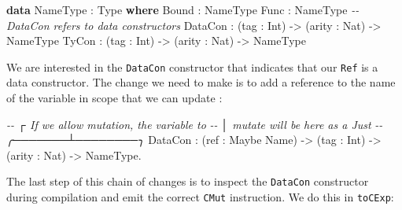 \documentclass[
]{article}
\newenvironment{Shaded}{}{}
\newcommand{\CommentTok}[1]{\textcolor[rgb]{0.38,0.63,0.69}{\textit{#1}}}
\newcommand{\DataTypeTok}[1]{\textcolor[rgb]{0.56,0.13,0.00}{#1}}
\newcommand{\FunctionTok}[1]{\textcolor[rgb]{0.02,0.16,0.49}{#1}}
\newcommand{\KeywordTok}[1]{\textcolor[rgb]{0.00,0.44,0.13}{\textbf{#1}}}
\newcommand{\NormalTok}[1]{#1}
\newcommand{\OperatorTok}[1]{\textcolor[rgb]{0.40,0.40,0.40}{#1}}
\newcommand{\OtherTok}[1]{\textcolor[rgb]{0.00,0.44,0.13}{#1}}
\begin{document}
\begin{Shaded}
\begin{Highlighting}[]
\KeywordTok{data} \DataTypeTok{NameType} \OperatorTok{:} \DataTypeTok{Type} \KeywordTok{where}
     \DataTypeTok{Bound}   \OperatorTok{:} \DataTypeTok{NameType}
     \DataTypeTok{Func}    \OperatorTok{:} \DataTypeTok{NameType}
     \CommentTok{{-}{-} DataCon refers to data constructors}
     \DataTypeTok{DataCon} \OperatorTok{:}\NormalTok{ (tag }\OperatorTok{:} \DataTypeTok{Int}\NormalTok{) }\OtherTok{{-}\textgreater{}}\NormalTok{ (arity }\OperatorTok{:} \DataTypeTok{Nat}\NormalTok{) }\OtherTok{{-}\textgreater{}} \DataTypeTok{NameType}
     \DataTypeTok{TyCon}   \OperatorTok{:}\NormalTok{ (tag }\OperatorTok{:} \DataTypeTok{Int}\NormalTok{) }\OtherTok{{-}\textgreater{}}\NormalTok{ (arity }\OperatorTok{:} \DataTypeTok{Nat}\NormalTok{) }\OtherTok{{-}\textgreater{}} \DataTypeTok{NameType}
\end{Highlighting}
\end{Shaded}

We are interested in the \texttt{DataCon} constructor that indicates
that our \texttt{Ref} is a data constructor. The change we need to make
is to add a reference to the name of the variable in scope that we can
update :

\begin{Shaded}
\begin{Highlighting}[]
\CommentTok{{-}{-}                ┌ If we allow mutation, the variable to}
\CommentTok{{-}{-}                │ mutate will be here as a \textasciigrave{}Just\textasciigrave{}}
\CommentTok{{-}{-}        ╭───────┴────────╮}
\DataTypeTok{DataCon} \OperatorTok{:}\NormalTok{ (ref }\OperatorTok{:} \DataTypeTok{Maybe} \DataTypeTok{Name}\NormalTok{) }\OtherTok{{-}\textgreater{}}\NormalTok{ (tag }\OperatorTok{:} \DataTypeTok{Int}\NormalTok{) }\OtherTok{{-}\textgreater{}}\NormalTok{ (arity }\OperatorTok{:} \DataTypeTok{Nat}\NormalTok{) }\OtherTok{{-}\textgreater{}} \DataTypeTok{NameType}\OtherTok{\textasciigrave{}.}
\end{Highlighting}
\end{Shaded}

The last step of this chain of changes is to inspect the
\texttt{DataCon} constructor during compilation and emit the correct
\texttt{CMut} instruction. We do this in \texttt{toCExp}:

\begin{Shaded}
\end{Shaded}
\end{document}

